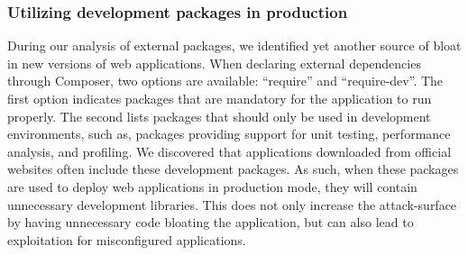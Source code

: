 \begin{table}[]
  \centering
  \caption{List of packages with known POP gadget chains}
\label{table:knowngadgets}
\end{table}


\subsubsection{Utilizing development packages in production}
During our analysis of external packages, we identified yet another source
of bloat in new versions of web applications. When declaring external
dependencies through Composer, two options are available: ``require'' and
``require-dev''. The first option indicates packages that are mandatory for
the application to run properly. The second lists packages that should only be
used in development environments, such as, packages providing support for unit
testing, performance analysis, and profiling. We discovered that applications
downloaded from official websites often include these development packages. As
such, when these packages are used to deploy web applications in production
mode, they will contain unnecessary development libraries. This does not
only increase the attack-surface by having unnecessary code bloating the
application, but can also lead to exploitation for misconfigured applications.

